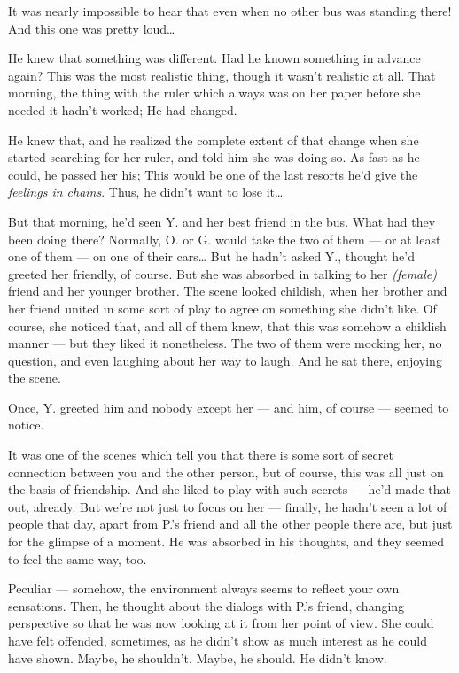 It was nearly impossible to hear that even when no other bus was standing there! And this one was pretty loud\ldots

He knew that something was different. Had he known something in advance again? This was the most realistic thing, though it wasn't realistic at all. 
That morning, the thing with the ruler which always was on her paper before she needed it hadn't worked; He had changed.

He knew that, and he realized the complete extent of that change when she started searching for her ruler, and told him she was doing so. As fast as he could, he passed her his; This would be one of the last resorts he'd give the \emph{feelings in chains}. Thus, he didn't want to lose it\ldots

But that morning, he'd seen Y. and her best friend in the bus. What had they been doing there? Normally, O. or G. would take the two of them --- or at least one of them --- on one of their cars\ldots
But he hadn't asked Y., thought he'd greeted her friendly, of course. But she was absorbed in talking to her \emph{(female)} friend and her younger brother. The scene looked childish, when her brother and her friend united in some sort of play to agree on something she didn't like. Of course, she noticed that, and all of them knew, that this was somehow a childish manner --- but they liked it nonetheless. 
The two of them were mocking her, no question, and even laughing about her way to laugh. 
And he sat there, enjoying the scene. 

Once, Y. greeted him and nobody except her --- and him, of course --- seemed to notice. 

It was one of the scenes which tell you that there is some sort of secret connection between you and the other person, but of course, this was all just on the basis of friendship. And she liked to play with such secrets --- he'd made that out, already. 
But we're not just to focus on her --- finally, he hadn't seen a lot of people that day, apart from P.'s friend and all the other people there are, but just for the glimpse of a moment. 
He was absorbed in his thoughts, and they seemed to feel the same way, too. 

Peculiar --- somehow, the environment always seems to reflect your own sensations. 
Then, he thought about the dialogs with P.'s friend, changing perspective so that he was now looking at it from her point of view. 
She could have felt offended, sometimes, as he didn't show as much interest as he could have shown. Maybe, he shouldn't. Maybe, he should. 
He didn't know.

